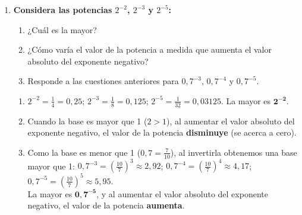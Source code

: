 \documentclass[a4paper,12pt]{article}
\begin{document}
\begin{enumerate}
    \item \textbf{Considera las potencias $2^{-2}$, $2^{-3}$ y $2^{-5}$:}
        \begin{enumerate}[label=\alph*)]
            \item ¿Cuál es la mayor?
            \item ¿Cómo varía el valor de la potencia a medida que aumenta el valor absoluto del exponente negativo?
            \item Responde a las cuestiones anteriores para $0,7^{-3}$, $0,7^{-4}$ y $0,7^{-5}$.
        \end{enumerate}
        \begin{solucion}
            \begin{enumerate}[label=\alph*)]
                \item $2^{-2} = \frac{1}{4} = 0,25$; $2^{-3} = \frac{1}{8} = 0,125$; $2^{-5} = \frac{1}{32} = 0,03125$. La mayor es $\mathbf{2^{-2}}$.
                \item Cuando la base es mayor que 1 ($2 > 1$), al aumentar el valor absoluto del exponente negativo, el valor de la potencia \textbf{disminuye} (se acerca a cero).
                \item Como la base es menor que 1 ($0,7 = \frac{7}{10}$), al invertirla obtenemos una base mayor que 1:
                $0,7^{-3} = (\frac{10}{7})^{3} \approx 2,92$; $0,7^{-4} = (\frac{10}{7})^{4} \approx 4,17$; $0,7^{-5} = (\frac{10}{7})^{5} \approx 5,95$. \\
                La mayor es $\mathbf{0,7^{-5}}$, y al aumentar el valor absoluto del exponente negativo, el valor de la potencia \textbf{aumenta}.
            \end{enumerate}
        \end{solucion}


\end{enumerate}
\end{document}
